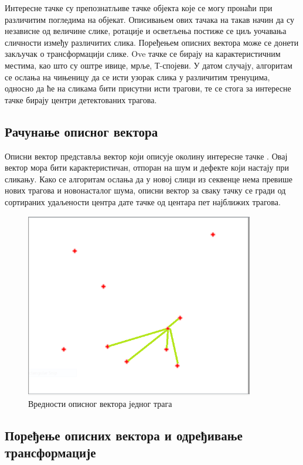 \documentclass[12pt,a4paper,serbian,oneside]{book}
\begin{document}
Интересне тачке су препознатљиве тачке објекта које се могу пронаћи при различитим погледима на објекат. Описивањем ових тачака на такав начин да су независне од величине слике, ротације и осветљења постиже се циљ уочавања сличности између различитих слика. Поређењем описних вектора може се донети закључак о трансформацији слике. Ove тачке  се бирају на карактеристичним местима, као што су оштре ивице, мрље, Т-спојеви. У датом случају, алгоритам се ослања на чињеницу да се исти узорак слика у различитим тренуцима, односно да ће на сликама бити присутни исти трагови,  те се стога за интересне тачке бирају центри детектованих трагова.

\subsection{Рачунање описног вектора}

Описни вектор представља вектор који описује околину интересне тачке . Овај вектор мора бити карактеристичан, отпоран на шум и дефекте који настају при сликању. Како се алгоритам ослања да у новој слици из секвенце нема превише нових трагова и новонасталог шума, описни вектор за сваку тачку се гради од сортираних удаљености центра дате тачке од центара пет најближих трагова.

\begin{figure}
\begin{center}
\includegraphics[width=100mm]{images/desc.png}
\end{center}
\caption{Вредности описног вектора једног трага}
\label{fig:desc}
\end{figure}

\subsection{Поређење описних вектора и одређивање трансформације}
\end{document}
